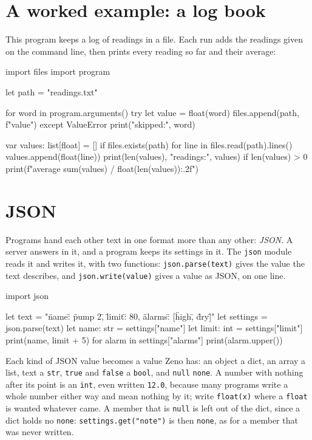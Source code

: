 \section{A worked example: a log book}

This program keeps a log of readings in a file. Each run adds the
readings given on the command line, then prints every reading so far
and their average:

\begin{zeno}[file=logbook.zeno, cmd=zeno run {file} 21.5 22.0 ;; zeno run {file} 23.5]
import files
import program

let path = "readings.txt"

for word in program.arguments() {
    try {
        let value = float(word)
        files.append(path, f"{value}\n")
    } except ValueError {
        print("skipped:", word)
    }
}

var values: list[float] = []
if files.exists(path) {
    for line in files.read(path).lines() {
        values.append(float(line))
    }
}
print(len(values), "readings:", values)
if len(values) > 0 {
    print(f"average {sum(values) / float(len(values)):.2f}")
}
\end{zeno}

\section{JSON}

Programs hand each other text in one format more than any other:
\emph{JSON}. A server answers in it, and a program keeps its settings
in it. The \verb|json| module reads it and writes it, with two
functions: \verb|json.parse(text)| gives the value the text
describes, and \verb|json.write(value)| gives a value as JSON, on one
line.

\begin{zeno}[file=settings.zeno, dir=json]
import json

let text = "{\"name\": \"pump 2\", \"limit\": 80, \"alarms\": [\"high\", \"dry\"]}"
let settings = json.parse(text)
let name: str = settings["name"]
let limit: int = settings["limit"]
print(name, limit + 5)
for alarm in settings["alarms"] {
    print(alarm.upper())
}
\end{zeno}

Each kind of JSON value becomes a value Zeno has: an object a dict, an
array a list, text a \verb|str|, \verb|true| and \verb|false| a
\verb|bool|, and \verb|null| \verb|none|. A number with nothing after
its point is an \verb|int|, even written \verb|12.0|, because many
programs write a whole number either way and mean nothing by it;
write \verb|float(x)| where a \verb|float| is wanted whatever came.
A member that is \verb|null| is left out of the dict, since a dict
holds no \verb|none|: \verb|settings.get("note")| is then
\verb|none|, as for a member that was never written.

